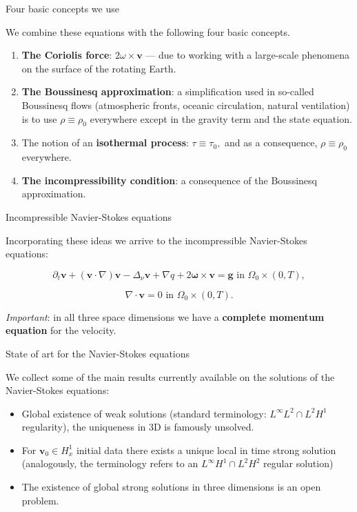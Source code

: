 \documentclass{beamer}
\begin{document}
\begin{frame}{Four basic concepts we use}

We combine these equations with the following four basic concepts.

\begin{enumerate}

\item \textbf{The Coriolis force}: $2 \omega \times \mathbf{v}$ --- due to working with a large-scale phenomena on the surface of the rotating Earth.
\item \textbf{The Boussinesq approximation}: a simplification used in so-called Boussinesq flows (atmospheric fronts, oceanic circulation, natural ventilation) is to use $\rho \equiv \rho_0$ everywhere except in the gravity term and the state equation.
\item The notion of an \textbf{isothermal process}: $\tau \equiv \tau_0,$ and as a consequence, $\rho \equiv \rho_0$ everywhere.
\item \textbf{The incompressibility condition}: a consequence of the Boussinesq approximation.

\end{enumerate}

\end{frame}

\begin{frame}{Incompressible Navier-Stokes equations}

Incorporating these ideas we arrive to the incompressible Navier-Stokes equations:

$$ \partial_t \mathbf{v} + (\mathbf{v} \cdot \nabla)\mathbf{v} -\Delta_{\nu} \mathbf{v} + \nabla q + 2 \mathbf{\omega} \times \mathbf{v}= \mathbf{g} \text{ in } \Omega_0 \times (0,T), $$
    
$$ \nabla \cdot \mathbf{v} = 0 \text{ in } \Omega_0 \times (0,T). $$

\textit{Important}: in all three space dimensions we have a \textbf{complete momentum equation} for the velocity.

\end{frame}

\begin{frame}{State of art for the Navier-Stokes equations}

We collect some of the main results currently available on the solutions of the Navier-Stokes equations:

\begin{itemize}

\item Global existence of weak solutions (standard terminology: $L^\infty L^2 \cap L^2 H^1$ regularity), the uniqueness in 3D is famously unsolved.
\item For $\mathbf{v}_0 \in H^1_x$ initial data there exists a unique local in time strong solution (analogously, the terminology refers to an $L^\infty H^1 \cap L^2 H^2$ regular solution)
\item The existence of global strong solutions in three dimensions is an open problem.

\end{itemize}

\end{frame}
\end{document}
